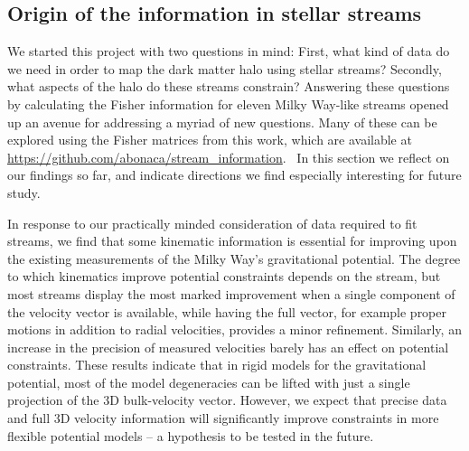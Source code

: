 \documentclass[modern]{aastex61}
\begin{document}
\subsection{Origin of the information in stellar streams}
\label{sec:dis_origin}
We started this project with two questions in mind:
First, what kind of data do we need in order to map the dark matter halo using stellar streams?
Secondly, what aspects of the halo do these streams constrain?
Answering these questions by calculating the Fisher information for eleven Milky Way-like streams opened up an avenue for addressing a myriad of new questions.
Many of these can be explored using the Fisher matrices from this work, which are available at \url{https://github.com/abonaca/stream_information}.\ %
In this section we reflect on our findings so far, and indicate directions we find especially interesting for future study.

In response to our practically minded consideration of data required to fit streams, we find that some kinematic information is essential for improving upon the existing measurements of the Milky Way's gravitational potential.
The degree to which kinematics improve potential constraints depends on the stream, but most streams display the most marked improvement when a single component of the velocity vector is available, while having the full vector, for example proper motions in addition to radial velocities, provides a minor refinement.
Similarly, an increase in the precision of measured velocities barely has an effect on potential constraints.
These results indicate that in rigid models for the gravitational potential, most of the model degeneracies can be lifted with just a single projection of the 3D bulk-velocity vector.
However, we expect that precise data and full 3D velocity information will significantly improve constraints in more flexible potential models  -- a hypothesis to be tested in the future.
\end{document}
